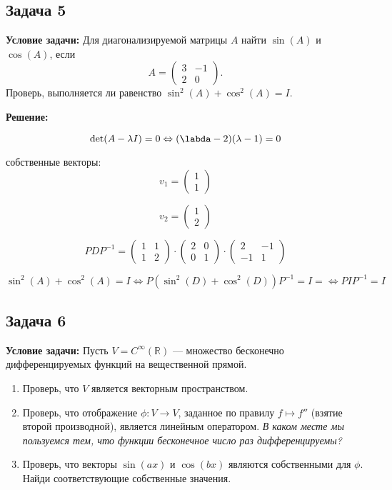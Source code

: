 \documentclass[a4paper,12pt]{article}
\begin{document}
\subsection{Задача 5}
\textbf{Условие задачи:} Для диагонализируемой матрицы $A$ найти $\sin(A)$ и $\cos(A)$, если
\[
A =
\begin{pmatrix}
3 & -1 \\
2 & 0
\end{pmatrix}.
\]
Проверь, выполняется ли равенство $\sin^2(A) + \cos^2(A) = I$.

\textbf{Решение: }

\[
\det(A-\lambda I) = 0 \Leftrightarrow (\labda - 2)(\lambda - 1) = 0
\]

собственные векторы: 
\[
v_1 = \begin{pmatrix}
    1 \\
    1
\end{pmatrix}
\]

\[
v_2 = \begin{pmatrix}
    1 \\
    2
\end{pmatrix}
\]

\[
PDP^{-1} = \begin{pmatrix}
    1 & 1 \\
    1 & 2 
\end{pmatrix} \cdot \begin{pmatrix}
    2 & 0 \\
    0 & 1 
\end{pmatrix} \cdot \begin{pmatrix}
    2 & -1 \\
    -1 & 1 
\end{pmatrix}
\]


\[
\sin^2(A) + \cos^2(A) = I \Longleftrightarrow P(\sin^2(D) + \cos^2(D))P^{-1} = I = \Longleftrightarrow PIP^{-1} = I
\]


\subsection{Задача 6}
\textbf{Условие задачи:} Пусть $V = C^\infty(\mathbb{R})$ — множество бесконечно дифференцируемых функций на вещественной прямой.
\begin{enumerate}
    \item Проверь, что $V$ является векторным пространством.
    \item Проверь, что отображение $\phi: V \to V$, заданное по правилу $f \mapsto f''$ (взятие второй производной), является линейным оператором. \emph{В каком месте мы пользуемся тем, что функции бесконечное число раз дифференцируемы?}
    \item Проверь, что векторы $\sin(ax)$ и $\cos(bx)$ являются собственными для $\phi$. Найди соответствующие собственные значения.
\end{enumerate}
\end{document}
